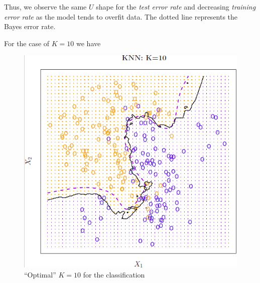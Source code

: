 \documentclass[11pt]{article}
\makeatletter
\def\maxwidth{\ifdim\Gin@nat@width>\linewidth\linewidth
    \else\Gin@nat@width\fi}
\let\Oldincludegraphics\includegraphics
\renewcommand{\includegraphics}[1]{\Oldincludegraphics[width=.8\maxwidth]{#1}}
\makeatother
\begin{document}
Thus, we observe the same \(U\) shape for the \emph{test error rate} and
decreasing \emph{training error rate} as the model tends to overfit
data. The dotted line represents the Bayes error rate.

For the case of \(K=10\) we have

\begin{figure}[h!]
    \centering
    \includegraphics{knn_k_optimal.png}
    \caption{``Optimal'' $K=10$ for the classification}
\end{figure}
\end{document}
